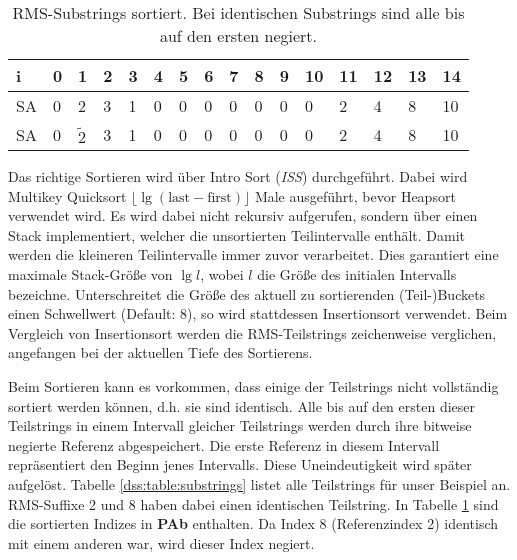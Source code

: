 \begin{table}
	\begin{tabular}{l|lllllllllllllll}
		i  & 0 & 1                                       & 2 & 3 & 4 & 5 & 6 & 7 & 8 & 9 & 10 & 11 & 12 & 13 & 14 \\ \hline
		SA & 0 & \cellcolor[HTML]{32CB00}2               & 3 & 1 & 0 & 0 & 0 & 0 & 0 & 0 & 0  & 2  & 4  & 8  & 10 \\ \hline
		SA & 0 & \cellcolor[HTML]{32CB00}$\widetilde{2}$ & 3 & 1 & 0 & 0 & 0 & 0 & 0 & 0 & 0  & 2  & 4  & 8  & 10 \\ \hline
	\end{tabular}
	\caption{RMS-Substrings sortiert. Bei identischen Substrings sind alle bis auf den ersten negiert.}
	\label{dss:table:substring-sorted}
\end{table}


Das richtige Sortieren wird über Intro Sort (\textit{ISS}) durchgeführt. Dabei wird Multikey Quicksort $\lfloor \lg (\text{last} - \text{first}) \rfloor$ Male ausgeführt, bevor Heapsort verwendet wird. Es wird dabei nicht rekursiv aufgerufen, sondern über einen Stack implementiert, welcher die unsortierten Teilintervalle enthält. Damit werden die kleineren Teilintervalle immer zuvor verarbeitet. Dies garantiert eine maximale Stack-Größe von $\lg l$, wobei $l$ die Größe des initialen Intervalls bezeichne. Unterschreitet die Größe des aktuell zu sortierenden (Teil-)Buckets einen Schwellwert (Default: 8), so wird stattdessen Insertionsort verwendet. Beim Vergleich von Insertionsort werden die RMS-Teilstrings zeichenweise verglichen, angefangen bei der aktuellen Tiefe des Sortierens.

Beim Sortieren kann es vorkommen, dass einige der Teilstrings nicht vollständig sortiert werden können, d.h. sie sind identisch. Alle bis auf den ersten dieser Teilstrings in einem Intervall gleicher Teilstrings werden durch ihre bitweise negierte Referenz abgespeichert. Die erste Referenz in diesem Intervall repräsentiert den Beginn jenes Intervalls. Diese Uneindeutigkeit wird später aufgelöst. Tabelle \ref{dss:table:substrings} listet alle Teilstrings für unser Beispiel an. RMS-Suffixe 2 und 8 haben dabei einen identischen Teilstring. In Tabelle \ref{dss:table:substring-sorted} sind die sortierten Indizes in \textbf{PAb} enthalten. Da Index 8 (Referenzindex 2) identisch mit einem anderen war, wird dieser Index negiert.



